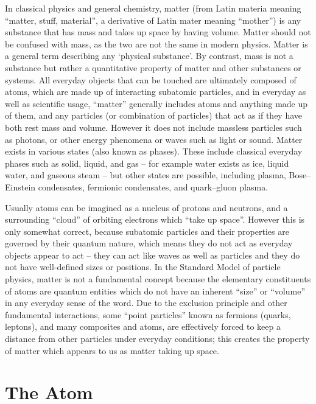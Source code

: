 \documentclass[
]{book}
\begin{document}
In classical physics and general chemistry, matter (from Latin materia meaning ``matter, stuff, material'', a derivative of Latin mater meaning ``mother'') is any substance that has mass and takes up space by having volume. Matter should not be confused with mass, as the two are not the same in modern physics. Matter is a general term describing any `physical substance'. By contrast, mass is not a substance but rather a quantitative property of matter and other substances or systems. All everyday objects that can be touched are ultimately composed of atoms, which are made up of interacting subatomic particles, and in everyday as well as scientific usage, ``matter'' generally includes atoms and anything made up of them, and any particles (or combination of particles) that act as if they have both rest mass and volume. However it does not include massless particles such as photons, or other energy phenomena or waves such as light or sound. Matter exists in various states (also known as phases). These include classical everyday phases such as solid, liquid, and gas -- for example water exists as ice, liquid water, and gaseous steam -- but other states are possible, including plasma, Bose--Einstein condensates, fermionic condensates, and quark--gluon plasma.

Usually atoms can be imagined as a nucleus of protons and neutrons, and a surrounding ``cloud'' of orbiting electrons which ``take up space''. However this is only somewhat correct, because subatomic particles and their properties are governed by their quantum nature, which means they do not act as everyday objects appear to act -- they can act like waves as well as particles and they do not have well-defined sizes or positions. In the Standard Model of particle physics, matter is not a fundamental concept because the elementary constituents of atoms are quantum entities which do not have an inherent ``size'' or ``volume'' in any everyday sense of the word. Due to the exclusion principle and other fundamental interactions, some ``point particles'' known as fermions (quarks, leptons), and many composites and atoms, are effectively forced to keep a distance from other particles under everyday conditions; this creates the property of matter which appears to us as matter taking up space.

\hypertarget{the-atom}{%
\section{The Atom}\label{the-atom}}
\end{document}
